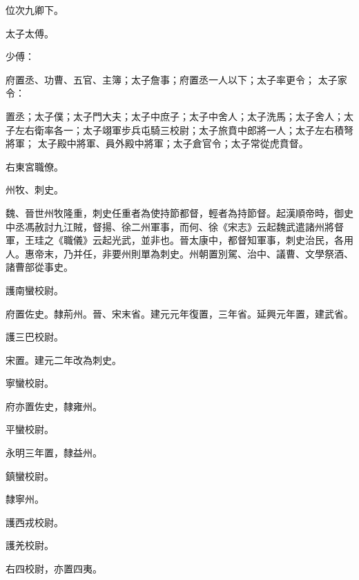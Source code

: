 \begin{pinyinscope}
 位次九卿下。



 太子太傅。



 少傅：



 府置丞、功曹、五官、主簿；太子詹事；府置丞一人以下；太子率更令；
 太子家令：



 置丞；太子僕；太子門大夫；太子中庶子；太子中舍人；太子洗馬；太子舍人；太子左右衛率各一；太子翊軍步兵屯騎三校尉；太子旅賁中郎將一人；太子左右積弩將軍；
 太子殿中將軍、員外殿中將軍；太子倉官令；太子常從虎賁督。



 右東宮職僚。



 州牧、刺史。



 魏、晉世州牧隆重，刺史任重者為使持節都督，輕者為持節督。起漢順帝時，御史中丞馮赦討九江賊，督揚、徐二州軍事，而何、徐《宋志》云起魏武遣諸州將督軍，王珪之《職儀》云起光武，並非也。晉太康中，都督知軍事，刺史治民，各用人。惠帝末，乃并任，非要州則單為刺史。州朝置別駕、治中、議曹、文學祭酒、諸曹部從事史。



 護南蠻校尉。



 府置佐史。隸荊州。晉、宋末省。建元元年復置，三年省。延興元年置，建武省。



 護三巴校尉。



 宋置。建元二年改為刺史。



 寧蠻校尉。



 府亦置佐史，隸雍州。



 平蠻校尉。



 永明三年置，隸益州。



 鎮蠻校尉。



 隸寧州。



 護西戎校尉。



 護羌校尉。



 右四校尉，亦置四夷。




\end{pinyinscope}
